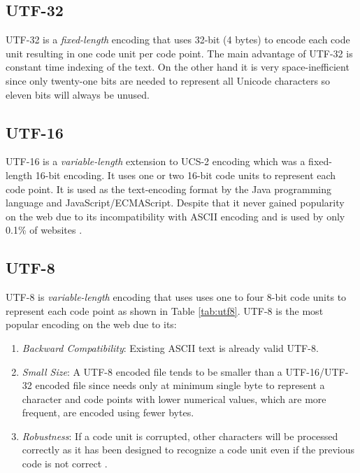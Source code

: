 \subsection{UTF-32}
UTF-32 is a \textit{fixed-length} encoding that uses 32-bit (4 bytes) to encode each code unit resulting in one code unit per code point. The main advantage of UTF-32 is constant time indexing of the text. On the other hand it is very space-inefficient since only twenty-one bits are needed to represent all Unicode characters so eleven bits will always be unused.

\subsection{UTF-16}
UTF-16 is a \textit{variable-length} extension to UCS-2 encoding which was a fixed-length 16-bit encoding. It uses one or two 16-bit code units to represent each code point. It is used as the text-encoding format by the Java programming language and JavaScript/ECMAScript. Despite that it never gained popularity on the web due to its incompatibility with ASCII encoding and is used by only 0.1\% of websites \cite{utf16usage}.

\subsection{UTF-8}
UTF-8 is \textit{variable-length} encoding that uses uses one to four 8-bit code units to represent each code point as shown in Table \ref{tab:utf8}. UTF-8 is the most popular encoding on the web \cite{utf8usage} due to its:
\begin{enumerate}
    \item \textit{Backward Compatibility}: Existing ASCII text is already valid UTF-8.
    \item \textit{Small Size}: A UTF-8 encoded file tends to be smaller than a UTF-16/UTF-32 encoded file since needs only at minimum single byte to represent a character and code points with lower numerical values, which are more frequent, are encoded using fewer bytes.
    \item \textit{Robustness}: If a code unit is corrupted, other characters will be processed correctly as it has been designed to recognize a code unit even if the previous code is not correct \cite{unicodeexplainedbook}.
\end{enumerate}

